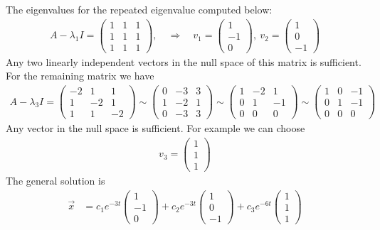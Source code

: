 \ifnum {} {\color{DarkBlue} The eigenvalues for the repeated eigenvalue computed below:
\begin{align}
    A - \lambda_1I = \begin{pmatrix} 1&1&1 \\1&1&1\\1&1&1\end{pmatrix}, \quad \Rightarrow \quad v_1 = \begin{pmatrix} 1\\-1\\0\end{pmatrix}, \ v_2 = \begin{pmatrix} 1\\0\\-1\end{pmatrix}
\end{align}
Any two linearly independent vectors in the null space of this matrix is sufficient.  For the remaining matrix we have
\begin{align}
    A - \lambda_3I = \begin{pmatrix} -2&1&1\\1&-2&1\\1&1&-2\end{pmatrix} \sim  \begin{pmatrix} 0&-3&3  \\1&-2&1\\0&-3&3\end{pmatrix}\sim  \begin{pmatrix} 1&-2&1\\0&1&-1\\0&0&0\end{pmatrix}\sim  \begin{pmatrix} 1&0&-1\\0&1&-1\\0&0&0\end{pmatrix} 
\end{align}
Any vector in the null space is sufficient. For example we can choose
\begin{align}
    v_3 = \begin{pmatrix} 1\\1\\1\end{pmatrix}
\end{align}
The general solution is
\begin{align}
    \vec x &= 
    c_1e^{-3t}\begin{pmatrix} 1\\-1\\0\end{pmatrix}
    +c_2 e^{-3t}\begin{pmatrix} 1\\0\\-1\end{pmatrix}
    +c_3 e^{-6t}\begin{pmatrix} 1\\1\\1\end{pmatrix}
\end{align}
} 
\else 
\vspace{3cm}
\fi
\fi





